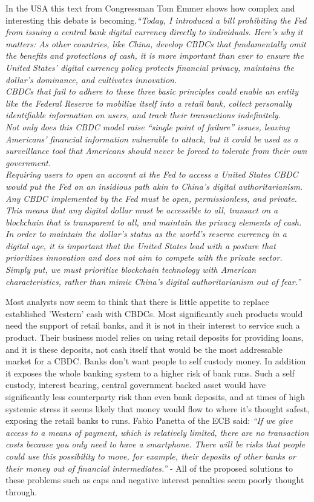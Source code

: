 In the USA this text from Congressman Tom Emmer shows how complex and interesting this debate is becoming.\textit{``Today, I introduced a bill prohibiting the Fed from issuing a central bank digital currency directly to individuals. Here’s why it matters: As other countries, like China, develop CBDCs that fundamentally omit the benefits and protections of cash, it is more important than ever to ensure the United States’ digital currency policy protects financial privacy, maintains the dollar’s dominance, and cultivates innovation.\\
CBDCs that fail to adhere to these three basic principles could enable an entity like the Federal Reserve to mobilize itself into a retail bank, collect personally identifiable information on users, and track their transactions indefinitely.\\
Not only does this CBDC model raise ``single point of failure'' issues, leaving Americans’ financial information vulnerable to attack, but it could be used as a surveillance tool that Americans should never be forced to tolerate from their own government.\\
Requiring users to open an account at the Fed to access a United States CBDC would put the Fed on an insidious path akin to China’s digital authoritarianism.\\
Any CBDC implemented by the Fed must be open, permissionless, and private. This means that any digital dollar must be accessible to all, transact on a blockchain that is transparent to all, and maintain the privacy elements of cash.\\
In order to maintain the dollar’s status as the world’s reserve currency in a digital age, it is important that the United States lead with a posture that prioritizes innovation and does not aim to compete with the private sector.\\
Simply put, we must prioritize blockchain technology with American characteristics, rather than mimic China’s digital authoritarianism out of fear.''}\par
Most analysts now seem to think that there is little appetite to replace established 'Western' cash with CBDCs. Most significantly such products would need the support of retail banks, and it is not in their interest to service such a product. Their business model relies on using retail deposits for providing loans, and it is these deposits, not cash itself that would be the most addressable market for a CBDC. Banks don't want people to self custody money. In addition it exposes the whole banking system to a higher risk of bank runs. Such a self custody, interest bearing, central government backed asset would have significantly less counterparty risk than even bank deposits, and at times of high systemic stress it seems likely that money would flow to where it's thought safest, exposing the retail banks to runs. Fabio Panetta of the ECB said: \textit{``If we give access to a means of payment, which is relatively limited, there are no transaction costs because you only need to have a smartphone. There will be risks that people could use this possibility to move, for example, their deposits of other banks or their money out of financial intermediates.''} - All of the proposed solutions to these problems such as caps and negative interest penalties seem poorly thought through.
